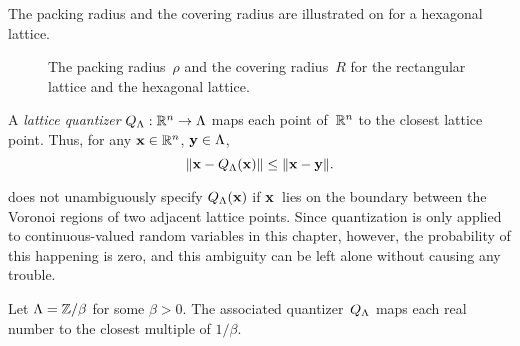 The packing radius and the covering radius are illustrated on
 for a hexagonal lattice.
\begin{figure}[tbp]
  \begin{center}
    
  \end{center}
  \caption{The packing radius~$\rho$ and the covering radius~$R$ for the
  rectangular lattice and the hexagonal lattice.}
  \label{fig:packingcoveringr}
\end{figure}

\begin{definition}
  \label{def:latticequant}
  A \emph{lattice quantizer} ${Q_{\Lambda}} : \mathbb{R}^n \rightarrow \Lambda$ maps each point
  of~$\mathbb{R}^n$ to the closest lattice point. Thus, for any $\mathbf{x} \in \mathbb{R}^n$, $\mathbf{y} \in
  \Lambda$,
  \begin{equation*}
    \| \mathbf{x} - {Q_{\Lambda}}(\mathbf{x}) \| \le \|\mathbf{x} - \mathbf{y}\|.
  \end{equation*}
\end{definition}

\begin{remark}
  \label{rem:latticequant}
   does not unambiguously specify ${Q_{\Lambda}}(\mathbf{x})$ if $\mathbf{x}$~lies on
  the boundary between the Voronoi regions of two adjacent lattice points. Since
  quantization is only applied to continuous-valued random variables in this
  chapter, however, the probability of this happening is zero, and this
  ambiguity can be left alone without causing any trouble.
\end{remark}

\begin{example}
  Let $\Lambda = \mathbb{Z} / \beta$ for some $\beta >0$. The associated
  quantizer~${Q_{\Lambda}}$ maps each real number to the closest multiple of $1/\beta$.
\end{example}

